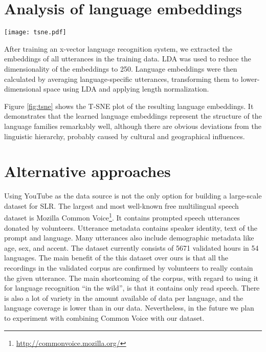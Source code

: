 \documentclass{article}
\begin{document}
\section{Analysis of language embeddings}


\begin{figure*}[tbh]
  \centering
  \texttt{[image: tsne.pdf]}
  \caption{T-SNE plot of the language embeddings.}
  \label{fig:tsne}
\end{figure*}

After training an x-vector language recognition system, we extracted the embeddings of all utterances in the training data. LDA was used to reduce the dimensionality of the embeddings to 250. Language embeddings were then calculated by averaging language-specific utterances, transforming them to lower-dimensional space using LDA and applying length normalization.

Figure \ref{fig:tsne} shows the T-SNE plot of the resulting language embeddings.
It demonstrates that the learned language embeddings represent the structure of the language families remarkably well, although there are obvious deviations from the linguistic hierarchy, probably caused by cultural and geographical influences.

\section{Alternative approaches}



Using YouTube as the data source is not the only option for building a large-scale dataset for SLR.
The largest and most well-known free multilingual speech dataset is Mozilla Common Voice\footnote{\url{http://commonvoice.mozilla.org/}}. It contains prompted speech utterances donated by volunteers. Utterance metadata contains speaker identity, text of the prompt and language. Many utterances also include demographic metadata like age, sex, and accent. The dataset currently consists of 5671 validated hours in 54 languages. The main benefit of the this dataset over ours is that all the recordings in the validated corpus are confirmed by volunteers to really contain the given utterance. The main shortcoming of the corpus, with regard to using it for language recognition ``in the wild'', is that it contains only read speech. There is also a lot of variety in the amount available of data per language, and the language coverage is lower than in our data. Nevertheless, in the future we plan to experiment with combining Common Voice with our dataset.
\end{document}
